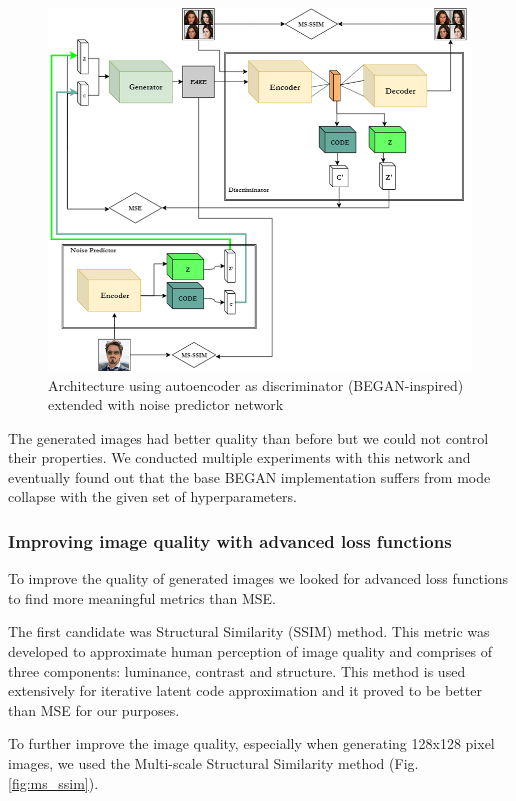 \documentclass[10pt,journal,compsoc]{IEEEtran}
\begin{document}
\begin{figure}[h]
	\centering
	\includegraphics[width=\linewidth]{pic/BInfoGAN+predictor}
	\caption{Architecture using autoencoder as discriminator (BEGAN-inspired) extended with noise predictor network}
	\label{fig:infogan_ae_noise}
\end{figure}

The generated images had better quality than before but we could not control their properties. We conducted multiple experiments with this network and eventually found out that the base BEGAN implementation suffers from mode collapse with the given set of hyperparameters.

\subsubsection{Improving image quality with advanced loss functions}

To improve the quality of generated images we looked for advanced loss functions to find more meaningful metrics than MSE.

The first candidate was Structural Similarity (SSIM) method. This metric was developed to approximate human perception of image quality and comprises of three components: luminance, contrast and structure. This method is used extensively for iterative latent code approximation and it proved to be better than MSE for our purposes.

To further improve the image quality, especially when generating 128x128 pixel images, we used the Multi-scale Structural Similarity method (Fig. \ref{fig:ms_ssim}).
\end{document}
